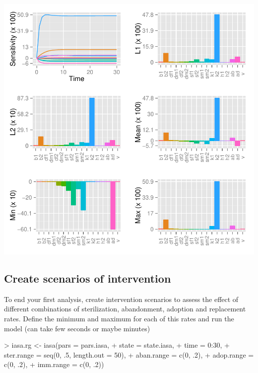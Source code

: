 \documentclass[a4paper]{article}
\begin{document}
\begin{center}
\begin{Schunk}
\begin{Soutput}
\end{Soutput}
\end{Schunk}
\includegraphics{capm_example-044}
\end{center}
\subsection{Create scenarios of intervention}
To end your first analysis, create intervention scenarios to assess the effect of different combinations of sterilization, abandonment, adoption and replacement rates. Define the minimum and maximum for each of this rates and run the model (can take few seconds or maybe minutes)

\begin{Schunk}
\begin{Sinput}
> iasa.rg <- iasa(pars = pars.iasa,
+                 state = state.iasa,
+                 time = 0:30,
+                 ster.range = seq(0, .5, length.out = 50),
+                 aban.range = c(0, .2),
+                 adop.range = c(0, .2),
+                 imm.range = c(0, .2))
\end{Sinput}
\end{Schunk}
\end{document}
